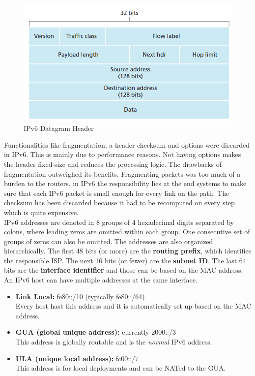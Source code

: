 \begin{figure}[H]
\centering
\includegraphics[width=.5\textwidth]{images/ipv6_header.PNG}
\caption{IPv6 Datagram Header}
\label{ipv6_header}
\end{figure}
Functionalities like fragmentation, a header checksum and options were discarded in IPv6. This is mainly due to performance reasons. Not having options makes the header fixed-size and reduces the processing logic. The drawbacks of fragmentation outweighed its benefits. Fragmenting packets was too much of a burden to the routers, in IPv6 the responsibility lies at the end systems to make sure that each IPv6 packet is small enough for every link on the path. The checksum has been discarded because it had to be recomputed on every step which is quite expensive.\vspace{.3cm}\\

IPv6 addresses are denoted in 8 groups of 4 hexadecimal digits separated by colons, where leading zeros are omitted within each group. One consecutive set of groups of zeros can also be omitted. The addresses are also organized hierarchically. The first 48 bits (or more) are the \textbf{routing prefix}, which identifies the responsible ISP. The next 16 bits (or fewer) are the \textbf{subnet ID}. The last 64 bits are the \textbf{interface identifier} and those can be based on the MAC address. An IPv6 host can have multiple addresses at the same interface.
\begin{itemize}
\item \textbf{Link Local:} fe80::/10 (typically fe80::/64)\\
Every host hast this address and it is automatically set up based on the MAC address.
\item \textbf{GUA (global unique address):} currently 2000::/3\\
This address is globally routable and is the \textit{normal} IPv6 address.
\item \textbf{ULA (unique local address):} fc00::/7\\
This address is for local deployments and can be NATed to the GUA.
\end{itemize}


